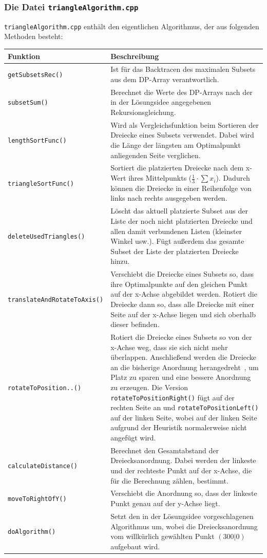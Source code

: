 \documentclass[a4paper, notitlepage, 12pt]{scrartcl}
\begin{document}
\subsubsection{Die Datei \texttt{triangleAlgorithm.cpp}}
\texttt{triangleAlgorithm.cpp} enthält den eigentlichen Algorithmus, der aus folgenden Methoden besteht:
\begin{longtabu} to \linewidth {lX}
	Funktion & Beschreibung \\ \hline \hline \endhead
	\texttt{getSubsetsRec()} & Ist für das Backtracen des maximalen Subsets aus dem DP-Array verantwortlich. \\ \hline
	\texttt{subsetSum()} & Berechnet die Werte des DP-Arrays nach der in der Lösungsidee angegebenen Rekursionsgleichung. \\ \hline
	\texttt{lengthSortFunc()} & Wird als Vergleichsfunktion beim Sortieren der Dreiecke eines Subsets verwendet. Dabei wird die Länge der längsten am Optimalpunkt anliegenden Seite verglichen.\\ \hline
	\texttt{triangleSortFunc()} & Sortiert die platzierten Dreiecke nach dem x-Wert ihres Mittelpunkts ($\frac{1}{3} \cdot \sum x_i$). Dadurch können die Dreiecke in einer Reihenfolge von links nach rechts ausgegeben werden.\\ \hline
	\texttt{deleteUsedTriangles()} & Löscht das aktuell platzierte Subset aus der Liste der noch nicht platzierten Dreiecke und allen damit verbundenen Listen (kleinster Winkel usw.). Fügt außerdem das gesamte Subset der Liste der platzierten Dreiecke hinzu.\\ \hline
	\texttt{translateAndRotateToAxis()}& Verschiebt die Dreiecke eines Subsets so, dass ihre Optimalpunkte auf den gleichen Punkt auf der x-Achse abgebildet werden. Rotiert die Dreiecke dann so, dass alle Dreiecke mit einer Seite auf der x-Achse liegen und sich oberhalb dieser befinden.\\ \hline
	\texttt{rotateToPosition..()} & Rotiert die Dreiecke eines Subsets so von der x-Achse weg, dass sie sich nicht mehr überlappen. Anschließend werden die Dreiecke an die bisherige Anordnung \glqq herangedreht\grqq~, um Platz zu sparen und eine bessere Anordnung zu erzeugen. Die Version \texttt{rotateToPositionRight()} fügt auf der rechten Seite an und \texttt{rotateToPositionLeft()} auf der linken Seite, wobei auf der linken Seite aufgrund der Heuristik normalerweise nicht angefügt wird.\\ \hline
	\texttt{calculateDistance()} & Berechnet den Gesamtabstand der Dreiecksanordnung. Dabei werden der linkeste und der rechteste Punkt auf der x-Achse, die für die Berechnung zählen, bestimmt.\\ \hline
	\texttt{moveToRightOfY()} & Verschiebt die Anordnung so, dass der linkeste Punkt genau auf der y-Achse liegt.\\ \hline
	\texttt{doAlgorithm()} & Setzt den in der Lösungsidee vorgeschlagenen Algorithmus um, wobei die Dreiecksanordnung vom willkürlich gewählten Punkt $(300|0)$ aufgebaut wird.\\
\end{longtabu}
\end{document}
